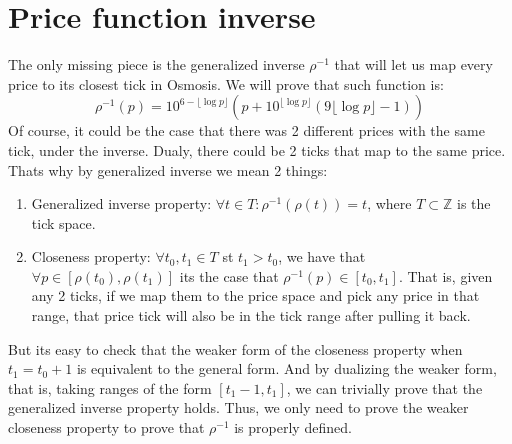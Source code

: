\documentclass[11pt]{article}
\begin{document}
\section{Price function inverse}
The only missing piece is the generalized inverse $\rho^{-1}$ that will let
us map every price to its closest tick in Osmosis. We will prove that such
function is:
\[
\rho^{-1}(p) = 10^{6-\lfloor\log p\rfloor} \left(
	p+10^{\lfloor\log p\rfloor}\left(
		9\lfloor\log p\rfloor-1
	\right)
\right)
\]
Of course, it could be the case that there was 2 different prices with
the same tick, under the inverse. Dualy, there could be 2 ticks that map
to the same price. Thats why by generalized inverse we mean 2 things:
\begin{enumerate}
    \item Generalized inverse property: $\forall t\in T: \rho^{-1}(\rho(t)) =
        t$, where $T\subset\mathbb Z$ is the tick space.
    \item Closeness property: $\forall t_0, t_1\in T$ st $t_1 > t_0$, we have
        that $\forall p\in [\rho(t_0), \rho(t_1)]$ its the case that
        $\rho^{-1}(p)\in[t_0, t_1]$. That is, given any 2 ticks, if we map them
        to the price space and pick any price in that range, that price tick will
        also be in the tick range after pulling it back.
\end{enumerate}
But its easy to check that the weaker form of the closeness property when $t_1
= t_0 + 1$ is equivalent to the general form. And by dualizing the weaker form,
that is, taking ranges of the form $[t_1 - 1, t_1]$, we can trivially prove that
the generalized inverse property holds. Thus, we only need to prove the weaker
closeness property to prove that $\rho^{-1}$ is properly defined.


\break


\end{document}
